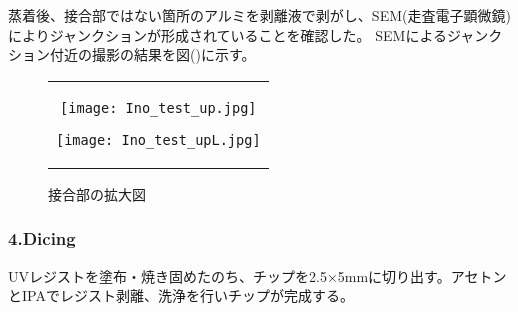蒸着後、接合部ではない箇所のアルミを剥離液で剥がし、SEM(走査電子顕微鏡)によりジャンクションが形成されていることを確認した。
SEMによるジャンクション付近の撮影の結果を図()に示す。
\begin{figure}[H]
    \begin{center}
        \begin{tabular}{c}
            \begin{minipage}{0.5\hsize}
                \begin{center}
                    \texttt{[image: Ino\_test\_up.jpg]}
                \end{center}
                \caption{2角度蒸着法で形成されたジョセフソン接合}
            \end{minipage}
            
            \begin{minipage}{0.5\hsize}
                \begin{center}
                    \texttt{[image: Ino\_test\_upL.jpg]}
                \end{center}
                \caption{接合部の拡大図}
            \end{minipage}
        \end{tabular}
    \end{center}
\end{figure}
\subsubsection{4.Dicing}
UVレジストを塗布・焼き固めたのち、チップを2.5×5mmに切り出す。アセトンとIPAでレジスト剥離、洗浄を行いチップが完成する。

